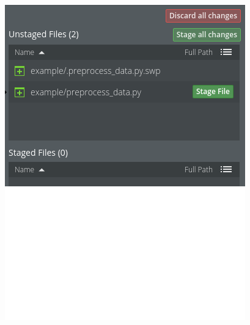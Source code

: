\begin{frame}
\begin{columns}
\begin{column}{0.65\textwidth}
\begin{figure}
\begin{overprint}
					\includegraphics[width=\textwidth]{pictures/kraken_stage.png}
				\end{overprint}
			\end{figure}
		\end{column}
	\end{columns}
\end{frame}
